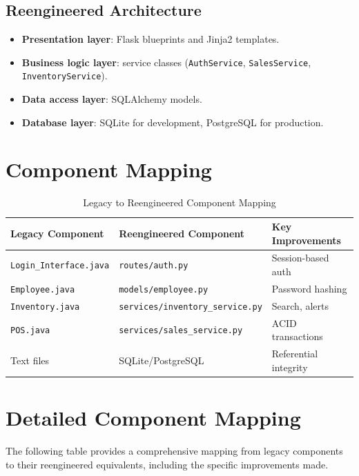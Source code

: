\subsection{Reengineered Architecture}

\begin{itemize}[leftmargin=1.2cm]
  \item \textbf{Presentation layer}: Flask blueprints and Jinja2 templates.
  \item \textbf{Business logic layer}: service classes (\texttt{AuthService},
        \texttt{SalesService}, \texttt{InventoryService}).
  \item \textbf{Data access layer}: SQLAlchemy models.
  \item \textbf{Database layer}: SQLite for development, PostgreSQL for production.
\end{itemize}

\section{Component Mapping}

\begin{table}[h]
  \centering
  \caption{Legacy to Reengineered Component Mapping}
  \begin{tabular}{p{4.0cm} p{5.0cm} p{4.0cm}}
    \toprule
    \textbf{Legacy Component} & \textbf{Reengineered Component} & \textbf{Key Improvements} \\
    \midrule
    \texttt{Login\_Interface.java} & \texttt{routes/auth.py} & Session-based auth \\
    \texttt{Employee.java} & \texttt{models/employee.py} & Password hashing \\
    \texttt{Inventory.java} & \texttt{services/inventory\_service.py} & Search, alerts \\
    \texttt{POS.java} & \texttt{services/sales\_service.py} & ACID transactions \\
    Text files & SQLite/PostgreSQL & Referential integrity \\
    \bottomrule
  \end{tabular}
\end{table}

\section{Detailed Component Mapping}

The following table provides a comprehensive mapping from legacy components
to their reengineered equivalents, including the specific improvements made.

